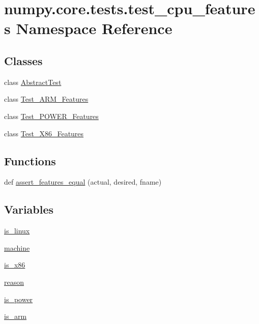 \hypertarget{namespacenumpy_1_1core_1_1tests_1_1test__cpu__features}{}\section{numpy.\+core.\+tests.\+test\+\_\+cpu\+\_\+features Namespace Reference}
\label{namespacenumpy_1_1core_1_1tests_1_1test__cpu__features}
\subsection*{Classes}
\begin{DoxyCompactItemize}
\item 
class \hyperlink{classnumpy_1_1core_1_1tests_1_1test__cpu__features_1_1AbstractTest}{Abstract\+Test}
\item 
class \hyperlink{classnumpy_1_1core_1_1tests_1_1test__cpu__features_1_1Test__ARM__Features}{Test\+\_\+\+A\+R\+M\+\_\+\+Features}
\item 
class \hyperlink{classnumpy_1_1core_1_1tests_1_1test__cpu__features_1_1Test__POWER__Features}{Test\+\_\+\+P\+O\+W\+E\+R\+\_\+\+Features}
\item 
class \hyperlink{classnumpy_1_1core_1_1tests_1_1test__cpu__features_1_1Test__X86__Features}{Test\+\_\+\+X86\+\_\+\+Features}
\end{DoxyCompactItemize}
\subsection*{Functions}
\begin{DoxyCompactItemize}
\item 
def \hyperlink{namespacenumpy_1_1core_1_1tests_1_1test__cpu__features_a5fd5f8c6d97a8aa13b1c8246bb5ef8ff}{assert\+\_\+features\+\_\+equal} (actual, desired, fname)
\end{DoxyCompactItemize}
\subsection*{Variables}
\begin{DoxyCompactItemize}
\item 
\hyperlink{namespacenumpy_1_1core_1_1tests_1_1test__cpu__features_a15c0104aa1b386573f305cb75ade2957}{is\+\_\+linux}
\item 
\hyperlink{namespacenumpy_1_1core_1_1tests_1_1test__cpu__features_aa95413bd12c5742e6d306bfc3919c587}{machine}
\item 
\hyperlink{namespacenumpy_1_1core_1_1tests_1_1test__cpu__features_aeee2f6699eaa73046454d58ce83e26a1}{is\+\_\+x86}
\item 
\hyperlink{namespacenumpy_1_1core_1_1tests_1_1test__cpu__features_a7248a2fa6fcb34e3826c0efc20fd7123}{reason}
\item 
\hyperlink{namespacenumpy_1_1core_1_1tests_1_1test__cpu__features_aedf89c838dfa612dcf85d12e2dd35698}{is\+\_\+power}
\item 
\hyperlink{namespacenumpy_1_1core_1_1tests_1_1test__cpu__features_a81c9634acaff8ab316eeab97014681b9}{is\+\_\+arm}
\end{DoxyCompactItemize}



